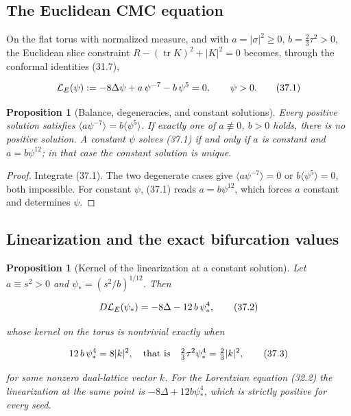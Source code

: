 \documentclass[11pt]{article}
\newtheorem{proposition}[theorem]{Proposition}
\theoremstyle{remark}
\begin{document}
\subsection{The Euclidean CMC equation}

On the flat torus with normalized measure, and with
\(a=|\sigma|^2\geq0\), \(b=\tfrac23\tau^2>0\), the Euclidean slice
constraint \(R-(\operatorname{tr}K)^2+|K|^2=0\) becomes, through the
conformal identities (31.7),

\[
 {\cal L}_E(\psi):=-8\Delta\psi+a\,\psi^{-7}-b\,\psi^{5}=0,
 \qquad\psi>0.                                                   \tag{37.1}
\]

\begin{proposition}[Balance, degeneracies, and constant solutions]
\label{prop:v19v34-basic}
Every positive solution satisfies
\(\langle a\psi^{-7}\rangle=b\langle\psi^5\rangle\).  If exactly one of
\(a\not\equiv0\), \(b>0\) holds, there is no positive solution.  A
constant \(\psi\) solves (37.1) if and only if \(a\) is constant and
\(a=b\psi^{12}\); in that case the constant solution is unique.
\end{proposition}

\begin{proof}
Integrate (37.1).  The two degenerate cases give
\(\langle a\psi^{-7}\rangle=0\) or \(b\langle\psi^5\rangle=0\), both
impossible.  For constant \(\psi\), (37.1) reads
\(a=b\psi^{12}\), which forces \(a\) constant and determines
\(\psi\).
\end{proof}

\subsection{Linearization and the exact bifurcation values}

\begin{proposition}[Kernel of the linearization at a constant solution]
\label{prop:v19v34-kernel}
Let \(a\equiv s^2>0\) and \(\psi_*=(s^2/b)^{1/12}\).  Then

\[
 D{\cal L}_E(\psi_*)=-8\Delta-12\,b\,\psi_*^{4},                   \tag{37.2}
\]

whose kernel on the torus is nontrivial exactly when

\[
 12\,b\,\psi_*^{4}=8|k|^2,\quad\hbox{that is}\quad
 \tfrac23\tau^2\psi_*^4=\tfrac23|k|^2,                             \tag{37.3}
\]

for some nonzero dual-lattice vector \(k\).  For the Lorentzian
equation (32.2) the linearization at the same point is
\(-8\Delta+12b\psi_*^4\), which is strictly positive for every seed.
\end{proposition}
\end{document}
